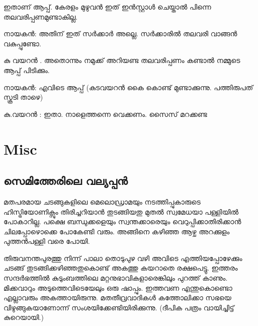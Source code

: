 \documentclass[10pt,a4paper]{report}
\begin{document}
ഇതാണ് ആപ്പ്. കേരളം മുഴുവൻ ഇത് ഇൻസ്റ്റാൾ ചെയ്താൽ പിന്നെ തലവരിപ്പണമുണ്ടാകില്ല. 

നായകൻ: അതിന് ഇത് സർക്കാർ അല്ലെ. സർക്കാരിൽ തലവരി വാങ്ങൻ വകുപ്പുണ്ടോ.

 കു വയറൻ . അതൊന്നും നമുക്ക് അറിയണ്ട തലവരിപ്പണം കണ്ടാൽ നമ്മുടെ ആപ്പ് പിടിക്കും. 
 
 നായകൻ: എവിടെ ആപ്പ് (കുടവയറൻ കൈ കൊണ്ട് മുണ്ടാക്കുന്നു. പത്തിരുപത് സ്കൂടി താഴെ) 
 
 കു.വയറൻ : ഇതാ. നാളെത്തന്നെ വെക്കണം. സൈസ് മറക്കണ്ട  

\chapter{Misc}
\section{സെമിത്തേരിലെ വല്യപ്പൻ}
  മതപരമായ ചടങ്ങുകളിലെ മെലൊഡ്രാമയും നടത്തിപ്പുകാരുടെ ഹിസ്ട്രിയോണിക്സും തിരിച്ചറിയാൻ തുടങ്ങിയതു മുതൽ സ്വമേധയാ പള്ളിയിൽ പോകാറില്ല. പക്ഷെ ബന്ധുക്കളെയും സ്വന്തക്കാരെയും വെറുപ്പിക്കാതിരിക്കാൻ ചിലപ്പോഴൊക്കെ പോകേണ്ടി വരും. അങ്ങിനെ കഴിഞ്ഞ ആഴ്ച അറക്കുളം പുത്തൻപള്ളി വരെ പോയി. 
  
  തിരുവനന്തപുരത്തു നിന്ന് പാലാ തൊടുപുഴ വഴി അവിടെ എത്തിയപ്പോഴേക്കും ചടങ്ങ് തുടങ്ങിക്കഴിഞ്ഞതുകൊണ്ട് അകത്തു കയറാതെ രക്ഷപെട്ടു. ഇത്തരം സന്ദർഭത്തിൽ കുടുംബത്തിലെ മറ്റനുഭാവികളാരെങ്കിലും പുറത്ത് കാണും. മിക്കവാറും അടുത്തെവിടെയേലും ഒരു ഷാപ്പും. ഇത്തവണ എന്തുകൊണ്ടൊ എല്ലാവരും അകത്തായിരുന്നു. മതതീവ്രവാദികൾ കത്തോലിക്കാ സഭയെ വിഴുങ്ങുകയാണോന്ന് സംശയിക്കേണ്ടിയിരിക്കുന്നു. (ദീപിക പത്രം വായിച്ചിട്ട് കുറെയായി.)
  
\end{document}
